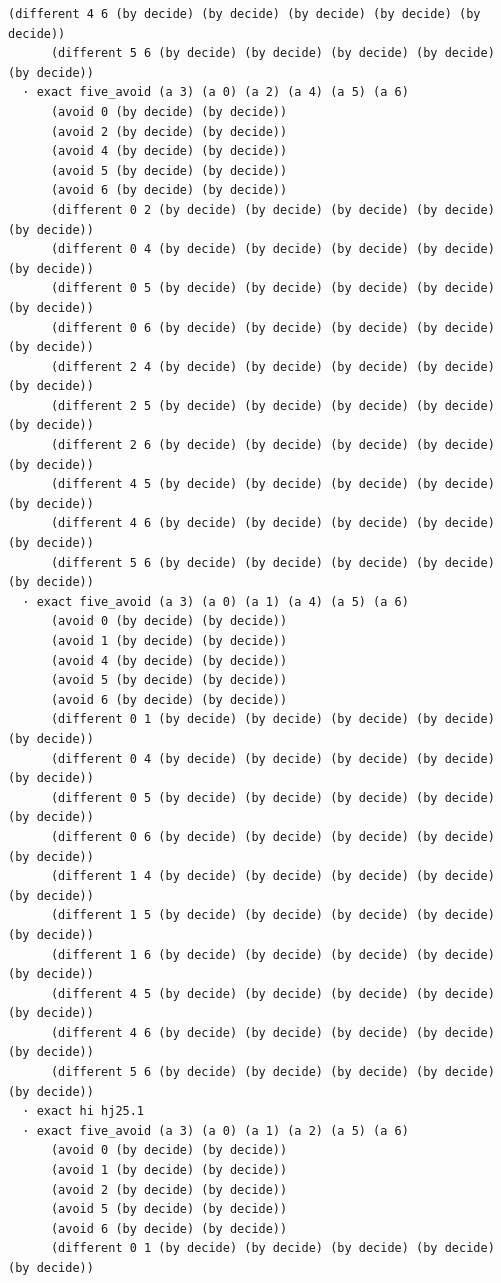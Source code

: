 \documentclass[11pt,a4paper]{article}
\begin{document}
\begin{Verbatim}[breaklines,breakanywhere,fontsize=\footnotesize]
      (different 4 6 (by decide) (by decide) (by decide) (by decide) (by decide))
      (different 5 6 (by decide) (by decide) (by decide) (by decide) (by decide))
  · exact five_avoid (a 3) (a 0) (a 2) (a 4) (a 5) (a 6)
      (avoid 0 (by decide) (by decide))
      (avoid 2 (by decide) (by decide))
      (avoid 4 (by decide) (by decide))
      (avoid 5 (by decide) (by decide))
      (avoid 6 (by decide) (by decide))
      (different 0 2 (by decide) (by decide) (by decide) (by decide) (by decide))
      (different 0 4 (by decide) (by decide) (by decide) (by decide) (by decide))
      (different 0 5 (by decide) (by decide) (by decide) (by decide) (by decide))
      (different 0 6 (by decide) (by decide) (by decide) (by decide) (by decide))
      (different 2 4 (by decide) (by decide) (by decide) (by decide) (by decide))
      (different 2 5 (by decide) (by decide) (by decide) (by decide) (by decide))
      (different 2 6 (by decide) (by decide) (by decide) (by decide) (by decide))
      (different 4 5 (by decide) (by decide) (by decide) (by decide) (by decide))
      (different 4 6 (by decide) (by decide) (by decide) (by decide) (by decide))
      (different 5 6 (by decide) (by decide) (by decide) (by decide) (by decide))
  · exact five_avoid (a 3) (a 0) (a 1) (a 4) (a 5) (a 6)
      (avoid 0 (by decide) (by decide))
      (avoid 1 (by decide) (by decide))
      (avoid 4 (by decide) (by decide))
      (avoid 5 (by decide) (by decide))
      (avoid 6 (by decide) (by decide))
      (different 0 1 (by decide) (by decide) (by decide) (by decide) (by decide))
      (different 0 4 (by decide) (by decide) (by decide) (by decide) (by decide))
      (different 0 5 (by decide) (by decide) (by decide) (by decide) (by decide))
      (different 0 6 (by decide) (by decide) (by decide) (by decide) (by decide))
      (different 1 4 (by decide) (by decide) (by decide) (by decide) (by decide))
      (different 1 5 (by decide) (by decide) (by decide) (by decide) (by decide))
      (different 1 6 (by decide) (by decide) (by decide) (by decide) (by decide))
      (different 4 5 (by decide) (by decide) (by decide) (by decide) (by decide))
      (different 4 6 (by decide) (by decide) (by decide) (by decide) (by decide))
      (different 5 6 (by decide) (by decide) (by decide) (by decide) (by decide))
  · exact hi hj25.1
  · exact five_avoid (a 3) (a 0) (a 1) (a 2) (a 5) (a 6)
      (avoid 0 (by decide) (by decide))
      (avoid 1 (by decide) (by decide))
      (avoid 2 (by decide) (by decide))
      (avoid 5 (by decide) (by decide))
      (avoid 6 (by decide) (by decide))
      (different 0 1 (by decide) (by decide) (by decide) (by decide) (by decide))

\end{Verbatim}
\end{document}
